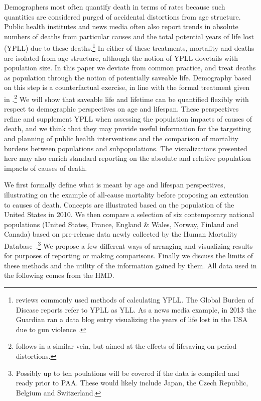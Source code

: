 \documentclass{article}
\begin{document}
Demographers most often quantify death in terms of rates 
because such quantities are considered purged of accidental distortions from
age structure. Public health institutes and news media often also report trends
in absolute numbers of deaths from particular causes and the total potential years of life lost (YPLL) due to
these deaths.\footnote{\citet{gardner1990} reviews commonly used methods of
calculating YPLL. The Global Burden of Disease reports refer to YPLL as YLL.
As a news media example, in 2013 the Guardian ran a data blog entry
visualizing the years of life lost in the USA due to gun violence
\citep{rogers2013gun}. } In either of these treatments, mortality and deaths are
isolated from age structure, although the notion of YPLL dovetails with
population size. In this paper we deviate from common practice, and treat deaths as population through the notion of potentially saveable
life. Demography based on this step is a counterfactual exercise, in
line with the formal treatment given in
\citet{vaupel1987repeated}.\footnote{\citet{vaupel2008lifesaving} follows in a
similar vein, but aimed at the effects of lifesaving on period distortions.} We
will show that saveable life and lifetime can be quantified flexibly with respect to demographic perspectives on age and lifespan. These perspectives refine and supplement YPLL when assessing the population impacts of causes of death, and we
think that they may provide useful information for the targetting and planning
of public health interventions and the comparison of mortality burdens between
populations and subpopulations. The visualizations presented here may also
enrich standard reporting on the absolute and relative population impacts of
causes of death.

We first formally define what is meant by age and lifespan
perspectives, illustrating on the example of all-cause
mortality before proposing an extention to causes of death. Concepts are
illustrated based on the population of the United States in 2010. We then
compare a selection of six contemporary national populations (United States, France, England \& Wales, Norway,
Finland and Canada) based on pre-release
data newly collected by the Human Mortality
Database~.\footnote{Possibly up to ten poulations will be
covered if the data is compiled and ready prior to PAA. These would likely
include Japan, the Czech Republic, Belgium and Switzerland.} We propose a few
different ways of arranging and visualizing results for purposes of reporting or making comparisons. Finally we discuss the limits of these methods and the utility of the information gained by them. All data used in the following comes from the HMD.
\end{document}
